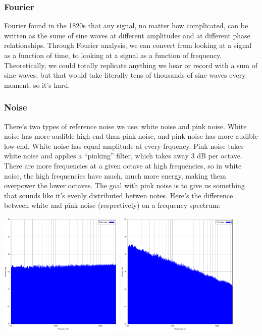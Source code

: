 \documentclass[a4paper]{article}
\begin{document}
\subsubsection{Fourier}
Fourier found in the 1820s that any signal, no matter how
complicated, can be written as the sume of sine waves at different amplitudes
and at different phase relationships. Through Fourier analysis, we can convert
from looking at a signal as a function of time, to looking at a signal as a
function of frequency. Theoretically, we could totally replicate anything we
hear or record with a sum of sine waves, but that would take literally tens of
thousands of sine waves every moment, so it's hard.

\subsubsection{Noise}
There's two types of reference noise we use: white noise and pink noise. White
noise has more audible high end than pink noise, and pink noise has more
audible low-end. White noise has equal amplitude at every frquency. Pink noise
takes white noise and applies a ``pinking'' filter, which takes away 3 dB per
octave. There are more frequencies at a given octave at high frequencies, so in
white noise, the high frequencies have much, much more energy, making them
overpower the lower octaves. The goal with pink noise is to give us something
that sounds like it's evenly distributed betwen notes.
Here's the difference between white and pink noise (respectively) on a frequency
spectrum:\\
\begin{center}
	\includegraphics[width=0.45\textwidth]{WhiteNoise.png}
	\includegraphics[width=0.45\textwidth]{PinkNoise.png}
\end{center}
\end{document}
